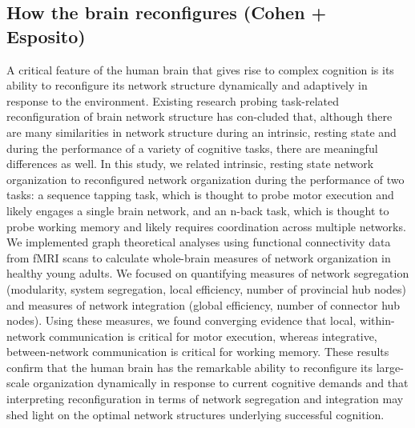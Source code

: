 \subsection{How the brain reconfigures (Cohen + Esposito)}
A critical feature of the human brain that gives rise to complex cognition is its ability to reconfigure its network structure dynamically and adaptively in response to the environment. Existing research probing task-related reconfiguration of brain network structure has con-cluded that, although there are many similarities in network structure during an intrinsic, resting state and during the performance of a variety of cognitive tasks, there are meaningful differences as well. In this study, we related intrinsic, resting state network organization to reconfigured network organization during the performance of two tasks: a sequence tapping task, which is thought to probe motor execution and likely engages a single brain network, and an n-back task, which is thought to probe working memory and likely requires coordination across multiple networks. We implemented graph theoretical analyses using functional connectivity data from fMRI scans to calculate whole-brain measures of network organization in healthy young adults. We focused on quantifying measures of network segregation (modularity, system segregation, local efficiency, number of provincial hub nodes) and measures of network integration (global efficiency, number of connector hub nodes). Using these measures, we found converging evidence that local, within-network communication is critical for motor execution, whereas integrative, between-network communication is critical for working memory. These results confirm that the human brain has the remarkable ability to reconfigure its large-scale organization dynamically in response to current cognitive demands and that interpreting reconfiguration in terms of network segregation and integration may shed light on the optimal network structures underlying successful cognition.